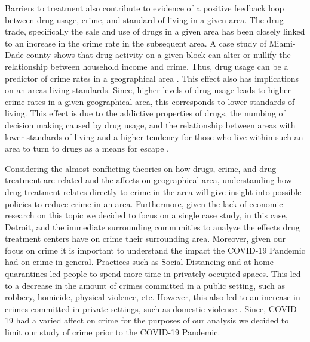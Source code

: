\documentclass[12pt]{article}
\begin{document}
Barriers to  treatment also contribute to evidence of a positive feedback loop between drug usage, crime, and standard of living in a given area. The drug trade, specifically the sale and use of drugs in a given area has been closely linked to an increase in the crime rate in the subsequent area. A case study of Miami-Dade county shows that drug activity on a given block can alter or nullify the relationship between household income and crime. Thus, drug usage can be a predictor of crime rates in a geographical area \cite{drugs_crime_space_time}. This effect also has implications on an areas living standards. Since, higher levels of drug usage leads to higher crime rates in a given geographical area, this corresponds to lower standards of living. This effect is due to the addictive properties of drugs, the numbing of decision making caused by drug usage, and the relationship between areas with lower standards of living and a higher tendency for those who live within such an area to turn to drugs as a means for escape \cite{drugs_and_crime}.

Considering the almost conflicting theories on how drugs, crime, and drug treatment are related and the affects on geographical area, understanding how drug treatment relates directly to crime in the area will give insight into possible policies to reduce crime in an area. Furthermore, given the lack of economic research on this topic we decided to focus on a single case study, in this case, Detroit, and the immediate surrounding communities to analyze the effects drug treatment centers have on crime their surrounding area. Moreover, given our focus on crime it is important to understand the impact the COVID-19 Pandemic had on crime in general. Practices such as Social Distancing and at-home quarantines led people to spend more time in privately occupied spaces. This led to a decrease in the amount of crimes committed in a public setting, such as robbery, homicide, physical violence, etc. However, this also led to an increase in crimes committed in private settings, such as domestic violence \cite{covid_and_crime}. Since, COVID-19 had a varied affect on crime for the purposes of our analysis we decided to limit our study of crime prior to the COVID-19 Pandemic.
\end{document}
